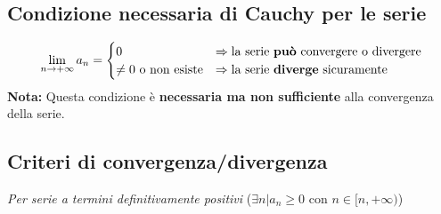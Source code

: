 \documentclass[12pt, a4paper]{article}
\begin{document}
    \subsection{Condizione necessaria di Cauchy per le serie}
        \begin{equation*}
            \lim_{n\rightarrow+\infty}a_n = \begin{cases}
                0 & \Rightarrow \text{la serie \textbf{può} convergere o divergere} \\
                \neq 0 \text{ o non esiste} & \Rightarrow \text{la serie \textbf{diverge} sicuramente}
            \end{cases}
        \end{equation*}
        \textbf{Nota: } Questa condizione è \textbf{necessaria ma non sufficiente} alla convergenza della serie.
    \subsection{Criteri di convergenza/divergenza}
        \textit{Per serie a termini definitivamente positivi} ($\exists n | a_n\geq 0 \text{ con }n\in[n,+\infty)$)
\end{document}
